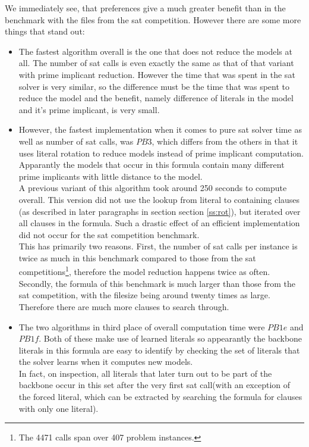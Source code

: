 We immediately see, that preferences give a much greater benefit than in the benchmark with the files from the sat competition. However there are some more things that stand out:
\begin{itemize}
\item The fastest algorithm overall is the one that does not reduce the models at all. The number of sat calls is even exactly the same as that of that variant with prime implicant reduction. However the time that was spent in the sat solver is very similar, so the difference must be the time that was spent to reduce the model and the benefit, namely difference of literals in the model and it's prime implicant, is very small.
\item However, the fastest implementation when it comes to pure sat solver time as well as number of sat calls, was $PB3$, which differs from the others in that it uses literal rotation to reduce models instead of prime implicant computation. Apparantly the models that occur in this formula contain many different prime implicants with little distance to the model.\\
A previous variant of this algorithm took around 250 seconds to compute overall. This version did not use the lookup from literal to containing clauses (as described in later paragraphs in section section \ref{ss:rot}), but iterated over all clauses in the formula. Such a drastic effect of an efficient implementation did not occur for the sat competition benchmark.\\
This has primarily two reasons. First, the number of sat calls per instance is twice as much in this benchmark compared to those from the sat competitions\footnote{The 4471 calls span over 407 problem instances.}, therefore the model reduction happens twice as often. Secondly, the formula of this benchmark is much larger than those from the sat competition, with the filesize being around twenty times as large. Therefore there are much more clauses to search through.
\item The two algorithms in third place of overall computation time were $PB1e$ and $PB1f$. Both of these make use of learned literals so appearantly the backbone literals in this formula are easy to identify by checking the set of literals that the solver learns when it computes new models.\\
In fact, on inspection, all literals that later turn out to be part of the backbone occur in this set after the very first sat call(with an exception of the forced literal, which can be extracted by searching the formula for clauses with only one literal).

\end{itemize}
